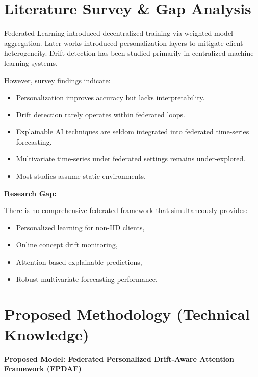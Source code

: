 \documentclass[11pt, a4paper]{article}
\begin{document}

\section{Literature Survey \& Gap Analysis}

Federated Learning introduced decentralized training via weighted model aggregation. Later works introduced personalization layers to mitigate client heterogeneity. Drift detection has been studied primarily in centralized machine learning systems.

However, survey findings indicate:

\begin{itemize}[noitemsep]
\item Personalization improves accuracy but lacks interpretability.
\item Drift detection rarely operates within federated loops.
\item Explainable AI techniques are seldom integrated into federated time-series forecasting.
\item Multivariate time-series under federated settings remains under-explored.
\item Most studies assume static environments.
\end{itemize}

\textbf{Research Gap:}

There is no comprehensive federated framework that simultaneously provides:

\begin{itemize}[noitemsep]
\item Personalized learning for non-IID clients,
\item Online concept drift monitoring,
\item Attention-based explainable predictions,
\item Robust multivariate forecasting performance.
\end{itemize}


\section{Proposed Methodology (Technical Knowledge)}

\textbf{Proposed Model: Federated Personalized Drift-Aware Attention Framework (FPDAF)}
\end{document}
